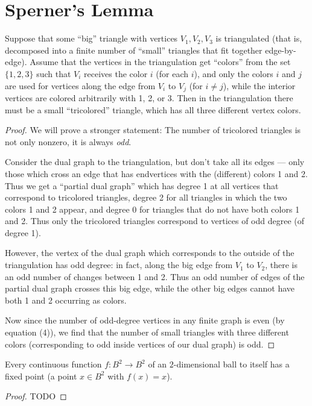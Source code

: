 \section{Sperner's Lemma}
\begin{lemma}
  \label{sperner}
  Suppose that some “big” triangle with vertices $V_1, V_2, V_3$ is triangulated (that is, decomposed into a finite number of “small” triangles that fit together edge-by-edge).
Assume that the vertices in the triangulation get “colors” from the set $\{1, 2, 3\}$ such that $V_i$ receives the color $i$ (for each $i$), and only the colors $i$ and $j$ are used for vertices along the edge from $V_i$ to $V_j$ (for $i \neq j$), while the interior vertices are colored arbitrarily with 1, 2, or 3.
Then in the triangulation there must be a small “tricolored” triangle, which has all three different vertex colors.
\end{lemma}
\begin{proof}
  We will prove a stronger statement: The number of tricolored triangles is not only nonzero,
  it is always \emph{odd}.

Consider the dual graph to the triangulation, but don’t take all its edges — only those which cross an edge that has endvertices with the (different) colors 1 and 2. Thus we get a “partial dual graph” which has degree 1 at all vertices that correspond to tricolored triangles, degree 2 for all triangles in which the two colors 1 and 2 appear, and degree 0 for triangles that do not have both colors 1 and 2. Thus only the tricolored triangles correspond to vertices of odd degree (of degree 1).

However, the vertex of the dual graph which corresponds to the outside of the triangulation has odd degree: in fact, along the big edge from $V_1$ to $V_2$, there is an odd number of changes between 1 and 2. Thus an odd number of edges of the partial dual graph crosses this big edge, while the other big edges cannot have both 1 and 2 occurring as colors.

Now since the number of odd-degree vertices in any finite graph is even (by equation (4)), we find that the number of small triangles with three different colors (corresponding to odd inside vertices of our dual graph) is odd.
\end{proof}

\begin{theorem}[Brower's Fixpoint (for $n=2$)]
  \label{brower}
  Every continuous function $f : B^2 \longrightarrow B^2$ of an $2$-dimensional ball to
  itself has a fixed point (a point $x \in B^2$ with $f(x) = x$).
\end{theorem}
\begin{proof}
  TODO
\end{proof}
